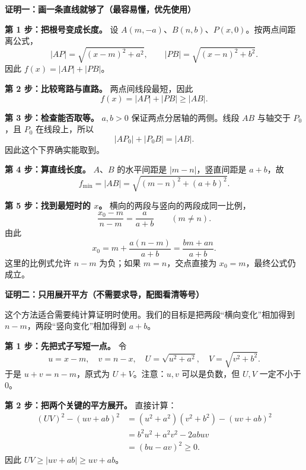 \clearpage
\begin{proofbox}
\textbf{\textcolor{CProof}{证明一：画一条直线就够了（最容易懂，优先使用）}}



\textbf{第 1 步：把根号变成长度。} 设 $A(m,-a)$、$B(n,b)$、$P(x,0)$。按两点间距离公式，
\[
 |AP|=\sqrt{(x-m)^2+a^2},\qquad
 |PB|=\sqrt{(x-n)^2+b^2}.
\]
因此 $f(x)=|AP|+|PB|$。

\textbf{第 2 步：比较弯路与直路。} 两点间线段最短，因此
\[
 f(x)=|AP|+|PB|\geq |AB|.
\]

\textbf{第 3 步：检查能否取等。} $a,b>0$ 保证两点分居轴的两侧。线段 $AB$ 与轴交于 $P_0$，且 $P_0$ 在线段上，所以
\[
 |AP_0|+|P_0B|=|AB|.
\]
因此这个下界确实能取到。

\textbf{第 4 步：算直线长度。} $A$、$B$ 的水平间距是 $|m-n|$，竖直间距是 $a+b$，故
\[
 \boxed{f_{\min}=|AB|=\sqrt{(m-n)^2+(a+b)^2}}.
\]

\textbf{第 5 步：找到最短时的 $x$。} 横向的两段与竖向的两段成同一比例，
\[
 \frac{x_0-m}{n-m}=\frac{a}{a+b}\qquad(m\ne n).
\]
由此
\[
 \boxed{x_0=m+\frac{a(n-m)}{a+b}=\frac{bm+an}{a+b}}.
\]
这里的比例式允许 $n-m$ 为负；如果 $m=n$，交点直接为 $x_0=m$，最终公式仍成立。

\medskip
\end{proofbox}
\clearpage
\begin{proofbox}
\textbf{\textcolor{CProof}{证明二：只用展开平方（不需要求导，配图看清等号）}}



这个方法适合需要纯计算证明时使用。我们的目标是把两段“横向变化”相加得到 $n-m$，两段“竖向变化”相加得到 $a+b$。

\textbf{第 1 步：先把式子写短一点。} 令
\[
 u=x-m,\quad v=n-x,\quad
 U=\sqrt{u^2+a^2},\quad V=\sqrt{v^2+b^2}.
\]
于是 $u+v=n-m$，原式为 $U+V$。注意：$u,v$ 可以是负数，但 $U,V$ 一定不小于 $0$。

\textbf{第 2 步：把两个关键的平方展开。} 直接计算：
\[
 \begin{aligned}
 (UV)^2-(uv+ab)^2
 &=(u^2+a^2)(v^2+b^2)-(uv+ab)^2\\
 &=b^2u^2+a^2v^2-2abuv\\
 &=(bu-av)^2\geq0.
 \end{aligned}
\]
因此 $UV\geq|uv+ab|\geq uv+ab$。

\end{proofbox}
\clearpage
